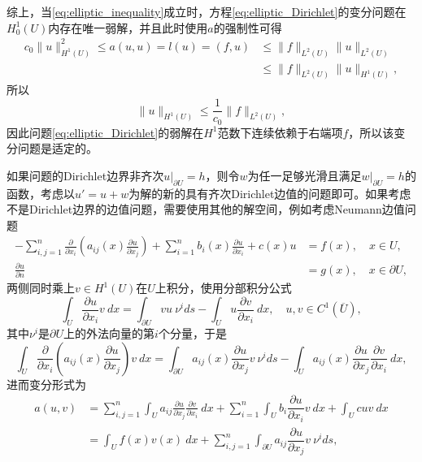 \documentclass[a4paper,10pt]{ctexart}
\begin{document}
综上，当\eqref{eq:elliptic_inequality}成立时，方程\eqref{eq:elliptic_Dirichlet}的变分问题在$ H^1_0(U) $内存在唯一弱解，并且此时使用$ a $的强制性可得
\[
    \begin{aligned}
        c_0 \| u \|_{H^1(U)}^2 \leqslant  a(u,u) = l(u) = (f,u)
        &\leqslant \| f \|_{L^2(U)}\| u \|_{L^2(U)}\\
        &\leqslant \| f \|_{L^2(U)}\| u \|_{H^1(U)},
    \end{aligned}
\]
所以
\begin{equation}
    \| u \|_{H^1(U)} \leqslant \frac{1}{c_0}\| f \|_{L^2(U)},
\end{equation}
因此问题\eqref{eq:elliptic_Dirichlet}的弱解在$ H^1 $范数下连续依赖于右端项$ f $，所以该变分问题是适定的。

如果问题的Dirichlet边界非齐次$ u|_{\partial U} = h $，则令$ w $为任一足够光滑且满足$ w|_{\partial U} = h $的函数，考虑以$ u' = u+w $为解的新的具有齐次Dirichlet边值的问题即可。如果考虑不是Dirichlet边界的边值问题，需要使用其他的解空间，例如考虑Neumann边值问题
\begin{equation}
    \begin{aligned}
        -\sum_{i,j=1}^n \frac{\partial}{\partial x_i}\left( a_{ij}(x)\frac{\partial u}{\partial x_j} \right) + \sum_{i=1}^n b_i(x)\frac{\partial u}{\partial x_i} + c(x)u &= f(x),\quad x\in U,\\
        \frac{\partial u}{\partial n} &= g(x),\quad x\in \partial U,
    \end{aligned}
\end{equation}
两侧同时乘上$ v\in H^1(U) $在$ U $上积分，使用分部积分公式
\begin{equation}
    \int_U \dfrac{\partial u}{\partial x_i} v\ dx = \int_{\partial U} v u\ \nu^id s - \int_U u\dfrac{\partial v}{\partial x_i}\ dx, \quad u,v\in C^1(\overline{U}),
\end{equation}
其中$ \nu^i $是$ \partial U $上的外法向量的第$ i $个分量，于是
\[
    \int_U \frac{\partial}{\partial x_i}\left( a_{ij}(x)\frac{\partial u}{\partial x_j} \right)v\ dx = \int_{\partial U} a_{ij}(x)\frac{\partial u}{\partial x_j}v\ \nu^id s - \int_U a_{ij}(x)\frac{\partial u}{\partial x_j}\dfrac{\partial v}{\partial x_i} \ d x,
\]
进而变分形式为
\begin{equation}
    \begin{aligned}
        a(u,v) &= \sum_{i,j=1}^n \int_U a_{ij}\frac{\partial u}{\partial x_j}\frac{\partial v}{\partial x_i}\ d x + \sum_{i=1}^n \int_Ub_i\dfrac{\partial u}{\partial x_i}v\ dx + \int_U cuv\ dx \\
        &= \int_U f(x)v(x)\ d x + \sum_{i,j=1}^n\int_{\partial U} a_{ij}\dfrac{\partial u}{\partial x_j}  v\ \nu^id s,
    \end{aligned}
\end{equation}
\end{document}
